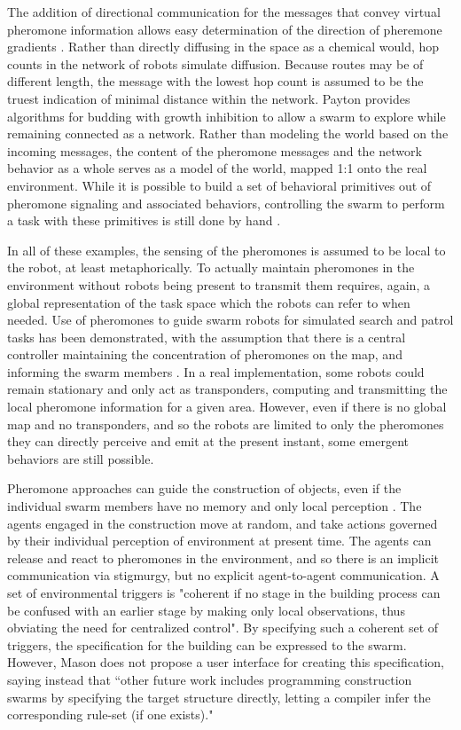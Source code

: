 \documentclass[]{article}
\begin{document}
The addition of directional communication for the messages that convey virtual pheromone information allows easy determination of the direction of pheremone gradients \cite{payton2001pheromone}.
Rather than directly diffusing in the space as a chemical would, hop counts in the network of robots simulate diffusion. 
Because routes may be of different length, the message with the lowest hop count is assumed to be the truest indication of minimal distance within the network. 
Payton provides algorithms for budding with growth inhibition to allow a swarm to explore while remaining connected as a network. 
Rather than modeling the world based on the incoming messages, the content of the pheromone messages and the network behavior as a whole serves as a model of the world, mapped 1:1 onto the real environment. 
While it is possible to build a set of behavioral primitives out of pheromone signaling and associated behaviors, controlling the swarm to perform a task with these primitives is still done by hand \cite{payton2003compound}.

In all of these examples, the sensing of the pheromones is assumed to be local to the robot, at least metaphorically. 
To actually maintain pheromones in the environment without robots being present to transmit them requires, again, a global representation of the task space which the robots can refer to when needed. 
Use of pheromones to guide swarm robots for simulated search and patrol tasks has been demonstrated, with the assumption that there is a central controller maintaining the concentration of pheromones on the map, and informing the swarm members \cite{coppin2012controlling}. 
In a real implementation, some robots could remain stationary and only act as transponders, computing and transmitting the local pheromone information for a given area. 
However, even if there is no global map and no transponders, and so the robots are limited to only the pheromones they can directly perceive and emit at the present instant, some emergent behaviors are still possible. 

Pheromone approaches can guide the construction of objects, even if the individual swarm members have no memory and only local perception \cite{mason2003programming}. 
The agents engaged in the construction move at random, and take actions governed by their individual perception of environment at present time. 
The agents can release and react to pheromones in the environment, and so there is an implicit communication via stigmurgy, but no explicit agent-to-agent communication. 
A set of environmental triggers is "coherent if no stage in the building process can be confused with an earlier stage by making only local observations, thus obviating the need for centralized control".   
By specifying such a coherent set of triggers, the specification for the building can be expressed to the swarm. 
However, Mason does not propose a user interface for creating this specification, saying instead that ``other future work includes programming construction swarms by specifying the target structure directly, letting a compiler infer the corresponding rule-set (if one exists)."
\end{document}
